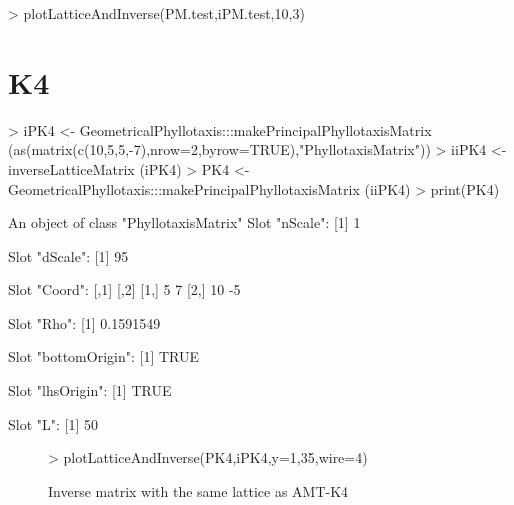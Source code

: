 \documentclass[a4paper]{article}
\begin{document}
\begin{Schunk}
\begin{Sinput}
> plotLatticeAndInverse(PM.test,iPM.test,10,3)
\end{Sinput}
\end{Schunk}
\clearpage
\section{K4}
\begin{Schunk}
\begin{Sinput}
> iPK4 <- GeometricalPhyllotaxis:::makePrincipalPhyllotaxisMatrix (as(matrix(c(10,5,5,-7),nrow=2,byrow=TRUE),"PhyllotaxisMatrix"))
> iiPK4 <- inverseLatticeMatrix (iPK4)
> PK4 <- GeometricalPhyllotaxis:::makePrincipalPhyllotaxisMatrix (iiPK4)
> print(PK4)
\end{Sinput}
\begin{Soutput}
An object of class "PhyllotaxisMatrix"
Slot "nScale":
[1] 1

Slot "dScale":
[1] 95

Slot "Coord":
     [,1] [,2]
[1,]    5    7
[2,]   10   -5

Slot "Rho":
[1] 0.1591549

Slot "bottomOrigin":
[1] TRUE

Slot "lhsOrigin":
[1] TRUE

Slot "L":
[1] 50
\end{Soutput}
\end{Schunk}
\begin{figure}\begin{center}
\begin{Schunk}
\begin{Sinput}
> plotLatticeAndInverse(PK4,iPK4,y=1,35,wire=4)
\end{Sinput}
\end{Schunk}
\caption{Inverse matrix with the same lattice as AMT-K4}
\end{center}
\end{figure}

\clearpage
\end{document}
